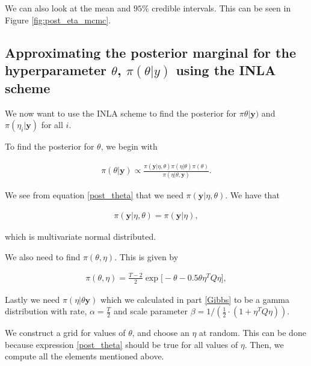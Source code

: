 We can also look at the mean and $95 \%$ credible intervals. This can be seen in Figure \ref{fig:post_eta_mcmc}.


\subsection{Approximating the posterior marginal for the hyperparameter $\theta$, $\pi(\theta|y)$ using the INLA scheme}
\label{theta_post_inla}

We now want to use the INLA scheme to find the posterior for $\pi\theta| \boldsymbol{y})$ and $\pi(\eta_i| \boldsymbol{y})$ for all $i$.


To find the posterior for $\theta$, we begin with

\begin{align}\label{post_theta}
    \pi(\theta|\mathbf{y}) \propto \frac{\pi(\mathbf{y}|\eta,\theta)\pi(\eta|\theta)\pi(\theta)}{\pi(\eta|\theta, \mathbf{y})}.
\end{align}

We see from equation \ref{post_theta} that we need $\pi(\boldsymbol{y}| \eta, \theta)$. We have that 

\begin{align}
    \pi(\mathbf{y}| \eta, \theta) = \pi(\mathbf{y}|\eta),  
\end{align}


which is multivariate normal distributed. 

We also need to find $\pi(\theta, \eta)$. This is given by 

\begin{align}
  \pi(\theta, \eta) = \frac{T-2}{2} \exp\bigg[-\theta - 0.5 \theta \eta^T Q \eta\bigg], 
\end{align}

Lastly we need $\pi(\eta| \theta \boldsymbol{y})$ which we calculated in part \ref{Gibbs} to be a gamma distribution with rate, $\alpha = \frac{T}{2}$ and scale parameter $\beta = 1/(\frac{1}{2}\cdot (1 + \eta^T Q \eta))$.


We construct a grid for values of $\theta$, and choose an $\eta$ at random. This can be done because expression \eqref{post_theta} should be true for all values of $\eta$. Then, we compute all the elements mentioned above.  

